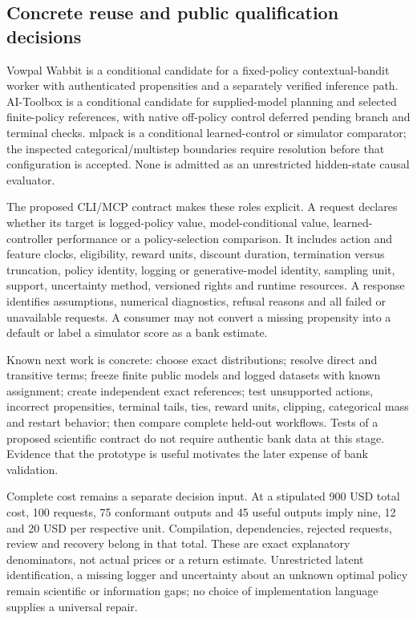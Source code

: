 \subsection{Concrete reuse and public qualification decisions}
Vowpal Wabbit is a conditional candidate for a fixed-policy contextual-bandit worker with authenticated propensities and a separately verified inference path. AI-Toolbox is a conditional candidate for supplied-model planning and selected finite-policy references, with native off-policy control deferred pending branch and terminal checks. mlpack is a conditional learned-control or simulator comparator; the inspected categorical/multistep boundaries require resolution before that configuration is accepted. None is admitted as an unrestricted hidden-state causal evaluator.~\citep{exec24_policycxx_comparison}

The proposed CLI/MCP contract makes these roles explicit. A request declares whether its target is logged-policy value, model-conditional value, learned-controller performance or a policy-selection comparison. It includes action and feature clocks, eligibility, reward units, discount duration, termination versus truncation, policy identity, logging or generative-model identity, sampling unit, support, uncertainty method, versioned rights and runtime resources. A response identifies assumptions, numerical diagnostics, refusal reasons and all failed or unavailable requests. A consumer may not convert a missing propensity into a default or label a simulator score as a bank estimate.~\citep{exec24_policycxx_comparison}

Known next work is concrete: choose exact distributions; resolve direct and transitive terms; freeze finite public models and logged datasets with known assignment; create independent exact references; test unsupported actions, incorrect propensities, terminal tails, ties, reward units, clipping, categorical mass and restart behavior; then compare complete held-out workflows. Tests of a proposed scientific contract do not require authentic bank data at this stage. Evidence that the prototype is useful motivates the later expense of bank validation.~\citep{exec24_policycxx_comparison}

Complete cost remains a separate decision input. At a stipulated 900 USD total cost, 100 requests, 75 conformant outputs and 45 useful outputs imply nine, 12 and 20 USD per respective unit. Compilation, dependencies, rejected requests, review and recovery belong in that total. These are exact explanatory denominators, not actual prices or a return estimate. Unrestricted latent identification, a missing logger and uncertainty about an unknown optimal policy remain scientific or information gaps; no choice of implementation language supplies a universal repair.~\citep{exec24_policycxx_comparison}


